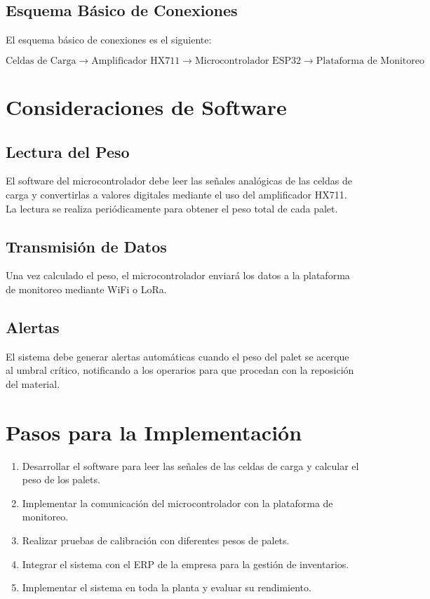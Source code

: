 \documentclass{article}
\begin{document}
\subsection{Esquema Básico de Conexiones}
El esquema básico de conexiones es el siguiente:

\[
\text{Celdas de Carga} \rightarrow \text{Amplificador HX711} \rightarrow \text{Microcontrolador ESP32} \rightarrow \text{Plataforma de Monitoreo}
\]

\section{Consideraciones de Software}

\subsection{Lectura del Peso}
El software del microcontrolador debe leer las señales analógicas de las celdas de carga y convertirlas a valores digitales mediante el uso del amplificador HX711. La lectura se realiza periódicamente para obtener el peso total de cada palet.

\subsection{Transmisión de Datos}
Una vez calculado el peso, el microcontrolador enviará los datos a la plataforma de monitoreo mediante WiFi o LoRa.

\subsection{Alertas}
El sistema debe generar alertas automáticas cuando el peso del palet se acerque al umbral crítico, notificando a los operarios para que procedan con la reposición del material.

\section{Pasos para la Implementación}

\begin{enumerate}
    \item Desarrollar el software para leer las señales de las celdas de carga y calcular el peso de los palets.
    \item Implementar la comunicación del microcontrolador con la plataforma de monitoreo.
    \item Realizar pruebas de calibración con diferentes pesos de palets.
    \item Integrar el sistema con el ERP de la empresa para la gestión de inventarios.
    \item Implementar el sistema en toda la planta y evaluar su rendimiento.
\end{enumerate}
\end{document}
